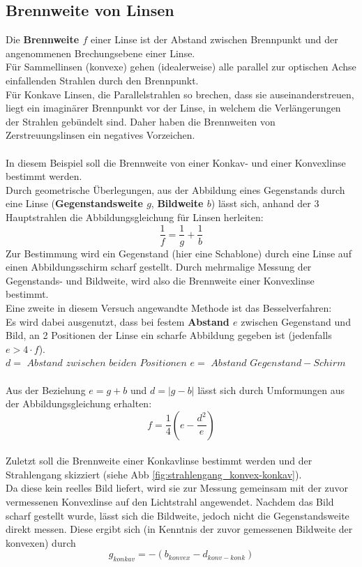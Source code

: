 \documentclass[12pt,a4paper]{article}
\begin{document}
\pagebreak
\setlength{\columnsep}{20pt}
\begin{multicols}{2}

\section{Brennweite von Linsen}
Die \textbf{Brennweite $f $} einer Linse ist der Abstand zwischen Brennpunkt und der angenommenen Brechungsebene einer Linse. \\
Für Sammellinsen (konvexe) gehen (idealerweise) alle parallel zur optischen Achse einfallenden Strahlen durch den Brennpunkt.\\
Für Konkave Linsen, die Parallelstrahlen so brechen, dass sie auseinanderstreuen, liegt ein imaginärer Brennpunkt vor der Linse, in welchem die Verlängerungen der Strahlen gebündelt sind. Daher haben die Brennweiten von Zerstreuungslinsen ein negatives Vorzeichen.\\
\\
In diesem Beispiel soll die Brennweite von einer Konkav- und einer Konvexlinse bestimmt werden.\\
Durch geometrische Überlegungen, aus der Abbildung eines Gegenstands durch eine Linse (\textbf{Gegenstandsweite $g$}, \textbf{Bildweite $b$}) lässt sich, anhand der 3 Hauptstrahlen die Abbildungsgleichung für Linsen herleiten:
$$\frac{1}{f}=\frac{1}{g}+ \frac{1}{b}$$
Zur Bestimmung wird ein Gegenstand (hier eine Schablone) durch eine Linse auf einen Abbildungsschirm scharf gestellt. Durch mehrmalige Messung der Gegenstands- und Bildweite, wird also die Brennweite einer Konvexlinse bestimmt.\\
Eine zweite in diesem Versuch angewandte Methode ist das Besselverfahren:\\
Es wird dabei ausgenutzt, dass bei festem \textbf{Abstand $e$} zwischen Gegenstand und Bild, an 2 Positionen der Linse ein scharfe Abbildung gegeben ist (jedenfalls $e > 4\cdot f$).\\
$d =$ $Abstand$ $zwischen$ $beiden$ $Positionen$
$e=$ $Abstand$ $Gegenstand-Schirm$\\
\\
Aus der Beziehung $e = g + b$ und $d=|g-b|$ lässt sich durch Umformungen aus der Abbildungsgleichung erhalten:
$$f=\frac{1}{4} \left(e-\frac{d^2}{e} \right)$$
\\
Zuletzt soll die Brennweite einer Konkavlinse bestimmt werden und der Strahlengang skizziert (siehe Abb \ref{fig:strahlengang_konvex-konkav}).\\
Da diese kein reelles Bild liefert, wird sie zur Messung gemeinsam mit der zuvor vermessenen Konvexlinse auf den Lichtstrahl angewendet. Nachdem das Bild scharf gestellt wurde, lässt sich die Bildweite, jedoch nicht die Gegenstandsweite direkt messen. Diese ergibt sich (in Kenntnis der zuvor gemessenen Bildweite der konvexen) durch
$$g_{konkav}= -(b_{konvex}-d_{konv-konk})$$



\end{multicols}
\end{document}
